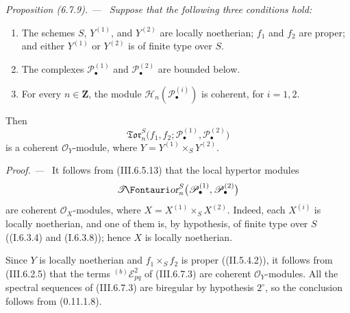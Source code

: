 \documentclass[10pt,oneside]{book}
\newcommand{\sh}[1]{\mathscr{#1}}
\newcommand{\shTor}{\sh{T}\textup{\kern-2.2pt{\Fontauri\slshape or}}}
\newcommand{\sref}[2][]{(#2)}
\newenvironment{proposition}[1][]{\par\medskip\noindent\itshape Proposition (#1). ---\ }{\par}
\newenvironment{proof}{\par\medskip\noindent\textit{Proof. ---\ }}{\par}
\begin{document}
\begin{proposition}[6.7.9]
\label{III.6.7.9}
Suppose that the following three conditions hold:
\begin{enumerate}
  \item[{$1^\circ$}]
    The schemes $S$, $Y^{(1)}$, and $Y^{(2)}$ are locally
    noetherian; $f_1$ and $f_2$ are proper; and either
    $Y^{(1)}$ or $Y^{(2)}$ is of finite type over $S$.
  \item[{$2^\circ$}]
    The complexes $\sh P_\bullet^{(1)}$ and
    $\sh P_\bullet^{(2)}$ are bounded below.
  \item[{$3^\circ$}]
    For every $n\in\mathbf Z$, the module
    $\sh H_n(\sh P_\bullet^{(i)})$ is coherent, for $i=1,2$.
\end{enumerate}
Then
\[
  \mathfrak{Tor}_n^S
  \bigl(
    f_1,f_2;
    \sh P_\bullet^{(1)},\sh P_\bullet^{(2)}
  \bigr)
\]
is a coherent $\sh O_Y$-module, where
$Y=Y^{(1)}\times_SY^{(2)}$.
\end{proposition}

\begin{proof}
It follows from \sref{III.6.5.13} that the local hypertor modules
\[
  \shTor_n^S
  \bigl(
    \sh P_\bullet^{(1)},\sh P_\bullet^{(2)}
  \bigr)
\]
are coherent $\sh O_X$-modules, where
$X=X^{(1)}\times_SX^{(2)}$.  Indeed, each $X^{(i)}$ is locally
noetherian, and one of them is, by hypothesis, of finite type over
    $S$ (\sref[I]{I.6.3.4} and \sref[I]{I.6.3.8}); hence $X$ is
locally noetherian.

Since $Y$ is locally noetherian and
$f_1\times_Sf_2$ is proper (\sref[II]{II.5.4.2}), it follows from
\sref{III.6.2.5} that the terms ${}^{(b)}\sh E_{pq}^2$ of
\sref{III.6.7.3} are coherent $\sh O_Y$-modules.  All the spectral
sequences of \sref{III.6.7.3} are biregular by hypothesis
$2^\circ$, so the conclusion follows from
\sref[0]{0.11.1.8}.
\end{proof}
\end{document}
